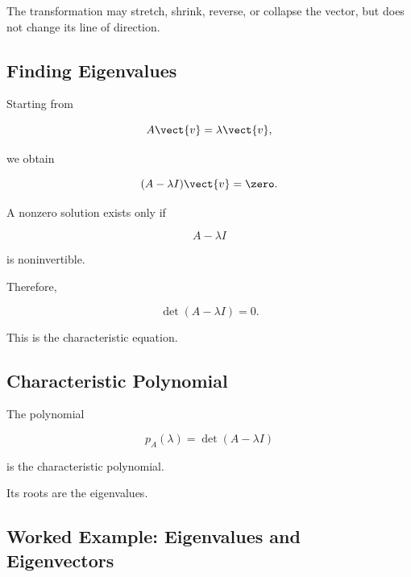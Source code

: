 The transformation may stretch, shrink, reverse, or collapse the vector, but
does not change its line of direction.

\subsection{Finding Eigenvalues}
\label{subsec:finding-eigenvalues}

Starting from

\[ A\vect{v}=\lambda\vect{v}, \]

we obtain

\[ (A-\lambda I)\vect{v}=\zero. \]

A nonzero solution exists only if

\[ A-\lambda I \]

is noninvertible.

Therefore,

\[ \det(A-\lambda I)=0. \]

This is the characteristic equation.

\subsection{Characteristic Polynomial}
\label{subsec:characteristic-polynomial}

The polynomial

\[ p_A(\lambda)=\det(A-\lambda I) \]

is the characteristic polynomial.

Its roots are the eigenvalues.

\subsection{Worked Example: Eigenvalues and Eigenvectors}
\label{subsec:worked-eigenvalues}

